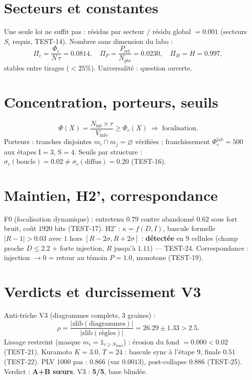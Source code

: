 \documentclass[11pt,a4paper]{article}
\begin{document}
\section{Secteurs et constantes}
Une seule loi ne suffit pas : résidus par secteur $/$ résidu global $= 0.001$
(secteurs $S_i$ requis, TEST-14).
Nombres sans dimension du labo : %
\begin{equation}
\Pi_c = \frac{\Phi_c}{N\,\tau} = 0.0814, \quad
\Pi_P = \frac{P_{\mathrm{ref}}}{N_{\mathrm{pts}}} = 0.0230, \quad
\Pi_H = H = 0.997,
\end{equation}
stables entre tirages ($< 25\%$). Universalité : question ouverte.

\section{Concentration, porteurs, seuils}
\begin{equation} %
\Phi(X) = \frac{N_{\mathrm{int}} \times \tau}{V_{\mathrm{info}}} \geq \Phi_c(X)
\;\Rightarrow\; \text{focalisation}.
\end{equation}
Porteurs : tranches disjointes $m_i \cap m_j = \varnothing$ vérifiées ;
franchissement $\Phi_c^{\mathrm{lab}} = 500$ aux étapes I$=3$, S$=4$.
Seuils par structure : $\sigma_c(\text{boucle}) = 0.02 \neq
\sigma_c(\text{diffus}) = 0.20$ (TEST-16).

\section{Maintien, H2', correspondance}
F0 (focalisation dynamique) : entretenu $0.79$ contre abandonné $0.62$ sous
fort bruit, coût $1920$ bits (TEST-17).
H2' : $\kappa = f(D, I)$, bascule formelle $|R-1| > 0.03$ avec $1$ hors
$[R-2\sigma, R+2\sigma]$ : \textbf{détectée} en 9 cellules (champ proche
$D \leq 2.2$ + forte injection, $R$ jusqu'à $1.11$) --- TEST-24.
Correspondance : injection $\to 0$ = retour au témoin $P = 1.0$, monotone (TEST-19).

\section{Verdicts et durcissement V3}
Anti-triche V3 (diagrammes complets, 3 graines) : %
\begin{equation}
\rho = \frac{|\mathrm{zlib}(\mathrm{diagrammes})|}{|\mathrm{zlib}(\mathrm{règles})|}
= 26.29 \pm 1.33 > 2.5.
\end{equation}
Lissage restreint (masque $m_i = \mathbb{1}_{i \geq N_{\mathrm{fond}}}$) :
érosion du fond $= 0.000 < 0.02$ (TEST-21).
Kuramoto $K = 3.0$, $T = 24$ : bascule sync à l'étape 9, finale $0.51$ (TEST-22).
PLV 1000 pas : $0.866$ (var $0.0013$), post-collapse $0.886$ (TEST-25).
Verdict : \textbf{A+B sœurs}. V3 : \textbf{5/5}, base blindée.
\end{document}
